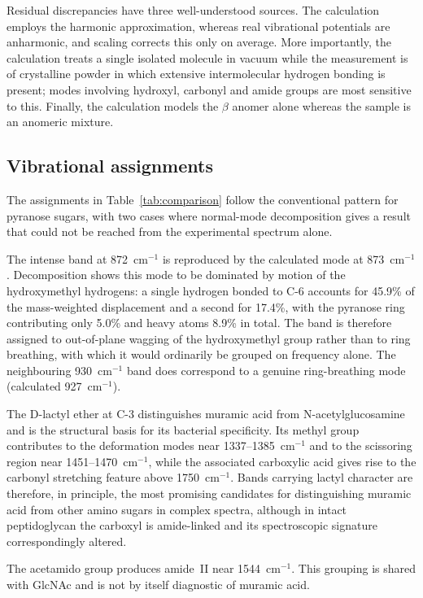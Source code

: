 \documentclass[preprint,12pt]{elsarticle}
\newcommand{\wn}{\ensuremath{\mathrm{cm}^{-1}}}
\begin{document}
Residual discrepancies have three well-understood sources. The calculation
employs the harmonic approximation, whereas real vibrational potentials are
anharmonic, and scaling corrects this only on average. More importantly, the
calculation treats a single isolated molecule in vacuum while the measurement is
of crystalline powder in which extensive intermolecular hydrogen bonding is
present; modes involving hydroxyl, carbonyl and amide groups are most sensitive
to this. Finally, the calculation models the $\beta$ anomer alone whereas the
sample is an anomeric mixture.

\subsection{Vibrational assignments}

The assignments in Table~\ref{tab:comparison} follow the conventional pattern
for pyranose sugars, with two cases where normal-mode decomposition gives a
result that could not be reached from the experimental spectrum alone.

The intense band at 872~\wn{} is reproduced by the calculated mode at
873~\wn{}. Decomposition shows this mode to be dominated by motion of the
hydroxymethyl hydrogens: a single hydrogen bonded to C-6 accounts for 45.9\% of
the mass-weighted displacement and a second for 17.4\%, with the pyranose ring
contributing only 5.0\% and heavy atoms 8.9\% in total. The band is therefore
assigned to out-of-plane wagging of the hydroxymethyl group rather than to ring
breathing, with which it would ordinarily be grouped on frequency alone. The
neighbouring 930~\wn{} band does correspond to a genuine ring-breathing mode
(calculated 927~\wn{}).

The D-lactyl ether at C-3 distinguishes muramic acid from N-acetylglucosamine
and is the structural basis for its bacterial specificity. Its methyl group
contributes to the deformation modes near 1337--1385~\wn{} and to the scissoring
region near 1451--1470~\wn{}, while the associated carboxylic acid gives rise to
the carbonyl stretching feature above 1750~\wn{}. Bands carrying lactyl
character are therefore, in principle, the most promising candidates for
distinguishing muramic acid from other amino sugars in complex spectra, although
in intact peptidoglycan the carboxyl is amide-linked and its spectroscopic
signature correspondingly altered.

The acetamido group produces amide~II near 1544~\wn{}. This grouping is shared
with GlcNAc and is not by itself diagnostic of muramic acid.
\end{document}
